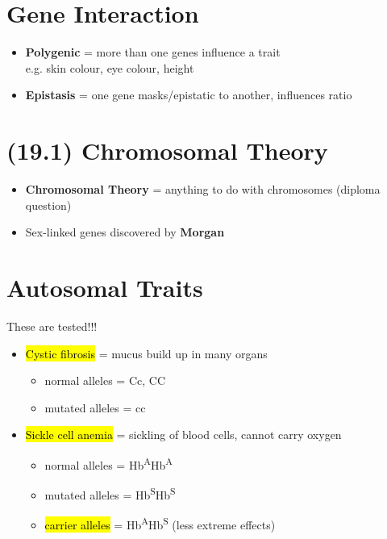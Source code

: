 \documentclass[a4paper,12pt]{article}
\begin{document}
\section{Gene Interaction}
\begin{itemize}
    \item{\textbf{Polygenic} = more than one genes influence a trait \\ e.g. skin colour, eye colour, height}
    \item{\textbf{Epistasis} = one gene masks/epistatic to another, influences ratio}
\end{itemize}

\section{(19.1) Chromosomal Theory}
\begin{itemize}
    \item{\textbf{Chromosomal Theory} = anything to do with chromosomes (diploma question)}
    \item{Sex-linked genes discovered by \textbf{Morgan}}
\end{itemize}

\section{Autosomal Traits}
These are tested!!!
\begin{itemize}
\item{
        \hl{Cystic fibrosis} = mucus build up in many organs
        \begin{itemize}
            \item{normal alleles = Cc, CC}
            \item{mutated alleles = cc}
        \end{itemize}
    }
                \item{
                        \hl{Sickle cell anemia} = sickling of blood cells, cannot carry oxygen
                        \begin{itemize}
                            \item{normal alleles = Hb\textsuperscript{A}Hb\textsuperscript{A}}
                            \item{mutated alleles = Hb\textsuperscript{S}Hb\textsuperscript{S}}
                            \item{\hl{carrier alleles} = Hb\textsuperscript{A}Hb\textsuperscript{S} (less extreme effects)}
                        \end{itemize}
                    }
\end{itemize}
\end{document}
